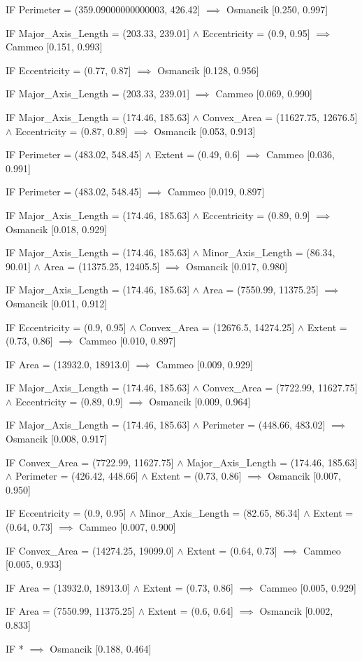 IF Perimeter = (359.09000000000003, 426.42] $\implies$ Osmancik [0.250, 0.997]

IF Major\_Axis\_Length = (203.33, 239.01] $\land$ Eccentricity = (0.9, 0.95] $\implies$ Cammeo [0.151, 0.993]

IF Eccentricity = (0.77, 0.87] $\implies$ Osmancik [0.128, 0.956]

IF Major\_Axis\_Length = (203.33, 239.01] $\implies$ Cammeo [0.069, 0.990]

IF Major\_Axis\_Length = (174.46, 185.63] $\land$ Convex\_Area = (11627.75, 12676.5] $\land$ Eccentricity = (0.87, 0.89] $\implies$ Osmancik [0.053, 0.913]

IF Perimeter = (483.02, 548.45] $\land$ Extent = (0.49, 0.6] $\implies$ Cammeo [0.036, 0.991]

IF Perimeter = (483.02, 548.45] $\implies$ Cammeo [0.019, 0.897]

IF Major\_Axis\_Length = (174.46, 185.63] $\land$ Eccentricity = (0.89, 0.9] $\implies$ Osmancik [0.018, 0.929]

IF Major\_Axis\_Length = (174.46, 185.63] $\land$ Minor\_Axis\_Length = (86.34, 90.01] $\land$ Area = (11375.25, 12405.5] $\implies$ Osmancik [0.017, 0.980]

IF Major\_Axis\_Length = (174.46, 185.63] $\land$ Area = (7550.99, 11375.25] $\implies$ Osmancik [0.011, 0.912]

IF Eccentricity = (0.9, 0.95] $\land$ Convex\_Area = (12676.5, 14274.25] $\land$ Extent = (0.73, 0.86] $\implies$ Cammeo [0.010, 0.897]

IF Area = (13932.0, 18913.0] $\implies$ Cammeo [0.009, 0.929]

IF Major\_Axis\_Length = (174.46, 185.63] $\land$ Convex\_Area = (7722.99, 11627.75] $\land$ Eccentricity = (0.89, 0.9] $\implies$ Osmancik [0.009, 0.964]

IF Major\_Axis\_Length = (174.46, 185.63] $\land$ Perimeter = (448.66, 483.02] $\implies$ Osmancik [0.008, 0.917]

IF Convex\_Area = (7722.99, 11627.75] $\land$ Major\_Axis\_Length = (174.46, 185.63] $\land$ Perimeter = (426.42, 448.66] $\land$ Extent = (0.73, 0.86] $\implies$ Osmancik [0.007, 0.950]

IF Eccentricity = (0.9, 0.95] $\land$ Minor\_Axis\_Length = (82.65, 86.34] $\land$ Extent = (0.64, 0.73] $\implies$ Cammeo [0.007, 0.900]

IF Convex\_Area = (14274.25, 19099.0] $\land$ Extent = (0.64, 0.73] $\implies$ Cammeo [0.005, 0.933]

IF Area = (13932.0, 18913.0] $\land$ Extent = (0.73, 0.86] $\implies$ Cammeo [0.005, 0.929]

IF Area = (7550.99, 11375.25] $\land$ Extent = (0.6, 0.64] $\implies$ Osmancik [0.002, 0.833]

IF * $\implies$ Osmancik [0.188, 0.464]
